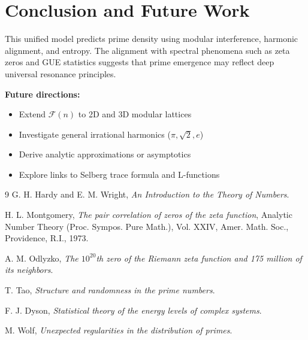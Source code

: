 \documentclass[12pt]{article}
\begin{document}
\section{Conclusion and Future Work}
This unified model predicts prime density using modular interference, harmonic alignment, and entropy. The alignment with spectral phenomena such as zeta zeros and GUE statistics suggests that prime emergence may reflect deep universal resonance principles.

\textbf{Future directions:}
\begin{itemize}
\item Extend \(\mathcal{F}(n)\) to 2D and 3D modular lattices
\item Investigate general irrational harmonics (\(\pi, \sqrt{2}, e\))
\item Derive analytic approximations or asymptotics
\item Explore links to Selberg trace formula and L-functions
\end{itemize}

\begin{thebibliography}{9}
G. H. Hardy and E. M. Wright, \textit{An Introduction to the Theory of Numbers}.

H. L. Montgomery, \textit{The pair correlation of zeros of the zeta function}, Analytic Number Theory (Proc. Sympos. Pure Math.), Vol. XXIV, Amer. Math. Soc., Providence, R.I., 1973.

A. M. Odlyzko, \textit{The $10^{20}$th zero of the Riemann zeta function and 175 million of its neighbors}.

T. Tao, \textit{Structure and randomness in the prime numbers}.

F. J. Dyson, \textit{Statistical theory of the energy levels of complex systems}.

M. Wolf, \textit{Unexpected regularities in the distribution of primes}.
\end{thebibliography}
\end{document}
